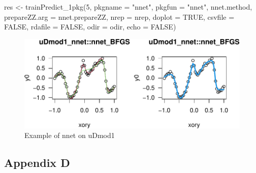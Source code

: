 \begin{Schunk}
\begin{Sinput}
res <- trainPredict_1pkg(5, pkgname = "nnet", pkgfun = "nnet", nnet.method,
  prepareZZ.arg = nnet.prepareZZ, nrep = nrep, doplot = TRUE,
  csvfile = FALSE, rdafile = FALSE, odir = odir, echo = FALSE)
\end{Sinput}
\begin{figure}

{\centering \includegraphics{unnamed-chunk-7-1} 

}

\caption[Example of nnet on uDmod1]{Example of nnet on uDmod1}\label{fig:unnamed-chunk-7}
\end{figure}
\end{Schunk}

\hypertarget{appendix-d}{%
\subsection{Appendix D}\label{appendix-d}}

